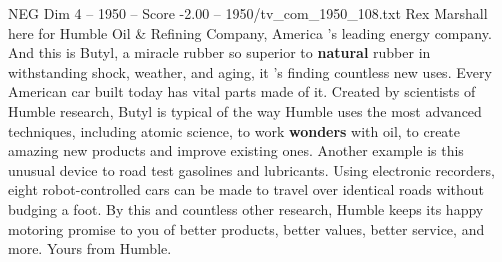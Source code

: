 \begin{textsample}{NEG Dim 4 – 1950 – Score -2.00 – 1950/tv\_com\_1950\_108.txt}  \label{ex:f4_neg_016}
Rex Marshall here for Humble Oil \& Refining Company, America 's leading energy company.
And this is Butyl, a miracle rubber so superior to \textbf{natural} rubber in withstanding shock, weather, and aging, it 's finding countless new uses.
Every American car built today has vital parts made of it.
Created by scientists of Humble research, Butyl is typical of the way Humble uses the most advanced techniques, including atomic science, to work \textbf{wonders} with oil, to create amazing new products and improve existing ones.
Another example is this unusual device to road test gasolines and lubricants.
Using electronic recorders, eight robot-controlled cars can be made to travel over identical roads without budging a foot.
By this and countless other research, Humble keeps its happy motoring promise to you of better products, better values, better service, and more.
Yours from Humble.

\end{textsample}
